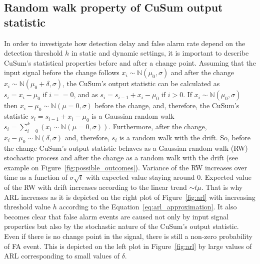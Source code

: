 \subsection{Random walk property of CuSum output statistic}
In order to investigate how detection delay and false alarm rate depend on the detection threshold $h$ in static and dynamic settings, it is important to describe CuSum's statistical properties before and after a change point.
Assuming that the input signal before the change follows
$x_i \sim \mathbb{N}(\mu_0, \sigma)$
and after the change
$x_i \sim \mathbb{N}(\mu_0 + \delta, \sigma)$, the
CuSum's output statistic can be calculated as
$s_i = x_i - \mu_0$ if $i == 0$,
and as
$s_i = s_{i-1} + x_i - \mu_0$ if $i > 0$.
%
If $x_i \sim \mathbb{N}(\mu_0, \sigma)$ then
$x_i - \mu_0 \sim \mathbb{N}(\mu=0, \sigma)$
before the change, and, therefore, the CuSum's statistic
$s_i =s_{i-1} + x_i - \mu_0$ is a Gaussian random walk
$s_i = \sum_{i=0}^{k} (x_i \sim \mathbb{N}(\mu=0, \sigma))$.
Furthermore, after the change,
$x_i - \mu_0 \sim \mathbb{N}(\delta, \sigma)$
and, therefore, $s_i$ is a random walk with the drift.
%
So, before the change CuSum's output statistic behaves as a Gaussian random walk (RW) stochastic process and after the change as a random walk with the drift (see example on Figure~\ref{fig:possible_outcomes}).
Variance of the RW increases over time as a function of $\sigma \sqrt{t}$ with expected value staying around $0$.
Expected value of the RW with drift increases according to the linear trend $\sim t \mu$.
That is why ARL increases as it is depicted on the right plot of Figure~\ref{fig:arl} with increasing threshold value $h$ according to the Equation~\ref{eq:arl_approximation}.
It also becomes clear that false alarm events are caused not only by input signal properties but also by the stochastic nature of the CuSum's output statistic.
Even if there is no change point in the signal, there is still a non-zero probability of FA event.
This is depicted on the left plot in Figure~\ref{fig:arl} by large values of ARL corresponding to small values of $\delta$.

